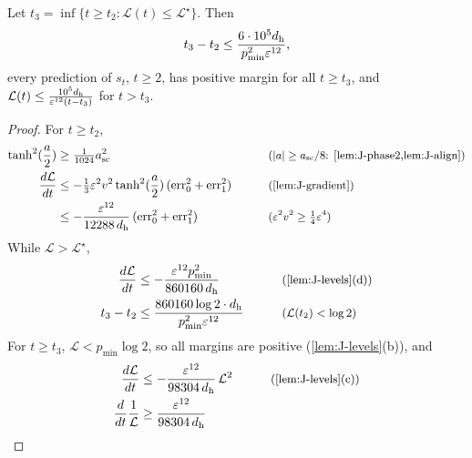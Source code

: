 \begin{lemma}[Descent]
\label{lem:J-descent}
Let $t_3=\inf\{t\ge t_2:\mathcal L(t)\le \mathcal L^\star\}$. Then
\[
 t_3-t_2\le\frac{6\cdot10^5d_{\mathrm h}}{p_{\min}^2\varepsilon^{12}},
\]
every prediction of $s_t$, $t\ge2$, has positive margin for all $t\ge t_3$, and $\mathcal L(t)\le\frac{10^5d_{\mathrm h}}{\varepsilon^{12}(t-t_3)}$ for $t>t_3$.
\end{lemma}

\begin{proof}
For $t\ge t_2$,
\begin{alignat*}{2}
 \tanh^2(\frac{a}{2})&\ge\tfrac{1}{1024}a_{\mathrm{sc}}^2 &\qquad& \why{$|a|\ge a_{\mathrm{sc}}/8$: \cref{lem:J-phase2,lem:J-align}}\\
 \ddt{\mathcal L}&\le-\tfrac{1}{3}\initscale^2v^2\tanh^2(\frac{a}{2})\,(\mathrm{err}_0^2+\mathrm{err}_1^2) && \why{\cref{lem:J-gradient}}\\
 &\le-\frac{\initscale^{12}}{12288\,d_{\mathrm h}}\,(\mathrm{err}_0^2+\mathrm{err}_1^2) && \why{$\initscale^2v^2\ge\tfrac{1}{4}\initscale^4$}
\end{alignat*}
While $\mathcal L>\mathcal L^\star$,
\begin{alignat*}{2}
 \ddt{\mathcal L}&\le-\frac{\initscale^{12}p_{\min}^2}{860160\,d_{\mathrm h}} &\qquad& \why{\cref{lem:J-levels}(d)}\\
 t_3-t_2&\le\frac{860160\log2\cdot d_{\mathrm h}}{p_{\min}^2\initscale^{12}} && \why{$\mathcal L(t_2)<\log2$}
\end{alignat*}
For $t\ge t_3$, $\mathcal L<p_{\min}\log2$, so all margins are positive (\cref{lem:J-levels}(b)), and
\begin{alignat*}{2}
 \ddt{\mathcal L}&\le-\frac{\initscale^{12}}{98304\,d_{\mathrm h}}\,\mathcal L^2 &\qquad& \why{\cref{lem:J-levels}(c)}\\
 \frac{d}{dt}\frac{1}{\mathcal L}&\ge\frac{\initscale^{12}}{98304\,d_{\mathrm h}} && 
\end{alignat*}
\end{proof}

